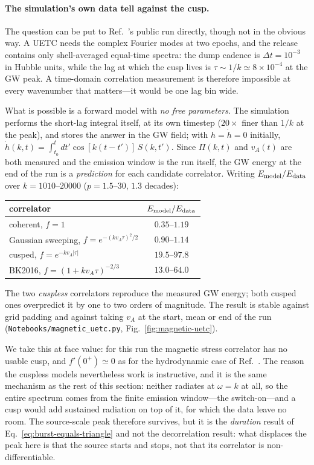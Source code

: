 \documentclass[10pt,prd,aps,nobibnotes,superscriptaddress,preprintnumbers,notitlepage]{revtex4-1}
\newcommand{\add}[1]{{\color{red}#1}}
\newcommand{\add}[1]{#1}
\begin{document}
\add{\paragraph{The simulation's own data tell against the cusp.} The question can be
put to Ref.~\cite{RoperPol:2019wvy}'s public run directly, though not in the obvious way.
A UETC needs the complex Fourier modes at two epochs, and the release contains only
shell-averaged equal-time spectra: the dump cadence is $\Delta t=10^{-3}$ in Hubble
units, while the lag at which the cusp lives is $\tau\sim1/k\simeq8\times10^{-4}$ at the
GW peak. A time-domain correlation measurement is therefore impossible at every
wavenumber that matters---it would be one lag bin wide.

What is possible is a forward model with \emph{no free parameters}. The simulation
performs the short-lag integral itself, at its own timestep ($20\times$ finer than
$1/k$ at the peak), and stores the answer in the GW field; with $h=\dot h=0$ initially,
$\dot h(k,t)=\int_{t_0}^{t}dt'\cos[k(t-t')]\,S(k,t')$. Since $\Pi(k,t)$ and $v_A(t)$ are
both measured and the emission window is the run itself, the GW energy at the end of the
run is a \emph{prediction} for each candidate correlator. Writing $E_{\rm model}/E_{\rm
data}$ over $k=1010$--$20000$ ($p=1.5$--$30$, $1.3$ decades):
\begin{center}
\begin{tabular}{@{}lc@{}}
\hline\hline
correlator & $E_{\rm model}/E_{\rm data}$ \\
\hline
coherent, $f=1$ & $0.35$--$1.19$ \\
Gaussian sweeping, $f=e^{-(kv_A\tau)^2/2}$ & $0.90$--$1.14$ \\
cusped, $f=e^{-kv_A|\tau|}$ & $19.5$--$97.8$ \\
BK2016, $f=(1+kv_A\tau)^{-2/3}$ & $13.0$--$64.0$ \\
\hline\hline
\end{tabular}
\end{center}
The two \emph{cuspless} correlators reproduce the measured GW energy; both cusped ones
overpredict it by one to two orders of magnitude. The result is stable against grid
padding and against taking $v_A$ at the start, mean or end of the run
(\texttt{Notebooks/magnetic\_uetc.py}, Fig.~\ref{fig:magnetic-uetc}).

We take this at face value: for this run the magnetic stress correlator has no usable
cusp, and $f'(0^{+})\simeq0$ as for the hydrodynamic case of
Ref.~\cite{Auclair:2022jod}. The reason the cuspless models nevertheless work is
instructive, and it is the same mechanism as the rest of this section: neither radiates
at $\omega=k$ at all, so the entire spectrum comes from the finite emission
window---the switch-on---and a cusp would add sustained radiation on top of it, for which
the data leave no room. The source-scale peak therefore survives, but it is the
\emph{duration} result of Eq.~\eqref{eq:burst-equals-triangle} and not the decorrelation
result: what displaces the peak here is that the source starts and stops, not that its
correlator is non-differentiable.

}
\end{document}
